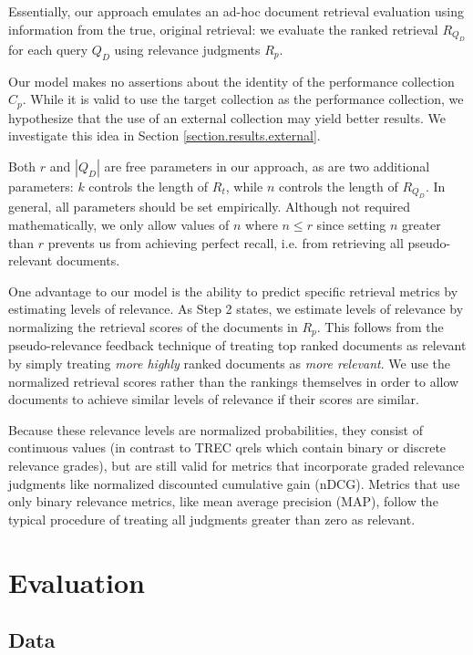 \documentclass{sig-alternate}
\begin{document}
Essentially, our approach emulates an ad-hoc document retrieval evaluation using information from the true, original retrieval: we evaluate the ranked retrieval $R_{Q_D}$ for each query $Q_D$ using relevance judgments $R_p$.

Our model makes no assertions about the identity of the performance collection $C_p$. While it is valid to use the target collection as the performance collection, we hypothesize that the use of an external collection may yield better results. We investigate this idea in Section \ref{section.results.external}.

Both $r$ and $|Q_D|$ are free parameters in our approach, as are two additional parameters: $k$ controls the length of $R_t$, while $n$ controls the length of $R_{Q_D}$. In general, all parameters should be set empirically. Although not required mathematically, we only allow values of $n$ where $n \leq r$ since setting $n$ greater than $r$ prevents us from achieving perfect recall, i.e. from retrieving all pseudo-relevant documents.

One advantage to our model is the ability to predict specific retrieval metrics by estimating levels of relevance. As Step 2 states, we estimate levels of relevance by normalizing the retrieval scores of the documents in $R_p$. This follows from the pseudo-relevance feedback technique of treating top ranked documents as relevant by simply treating \textit{more highly} ranked documents as \textit{more relevant}. We use the normalized retrieval scores rather than the rankings themselves in order to allow documents to achieve similar levels of relevance if their scores are similar.

Because these relevance levels are normalized probabilities, they consist of continuous values (in contrast to TREC qrels which contain binary or discrete relevance grades), but are still valid for metrics that incorporate graded relevance judgments like normalized discounted cumulative gain (nDCG). Metrics that use only binary relevance metrics, like mean average precision (MAP), follow the typical procedure of treating all judgments greater than zero as relevant.

\section{Evaluation}\label{section.evaluation}

\subsection{Data}\label{section.evaluation.data}
\end{document}
